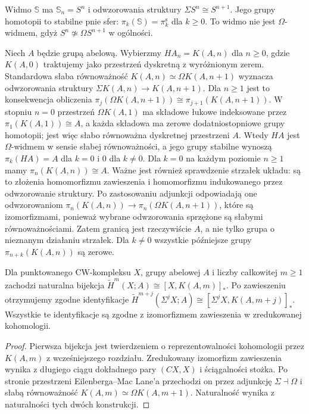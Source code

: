 \begin{przyklad}
Widmo $\mathbb S$ ma $\mathbb S_n=S^n$ i odwzorowania
struktury $\Sigma S^n\cong S^{n+1}$.
Jego grupy homotopii to stabilne pnie sfer:
$\pi_k(\mathbb S)=\pi_k^{\mathrm s}$ dla $k\ge0$.
To widmo nie jest $\Omega$-widmem, gdyż
$S^n\not\simeq\Omega S^{n+1}$ w ogólności.
\end{przyklad}

\begin{przyklad}
Niech $A$ będzie grupą abelową. Wybierzmy
$HA_n=K(A,n)$ dla $n\ge0$, gdzie $K(A,0)$
traktujemy jako przestrzeń dyskretną z wyróżnionym zerem.
Standardowa słaba równoważność
$K(A,n)\simeq\Omega K(A,n+1)$ wyznacza odwzorowania
struktury $\Sigma K(A,n)\to K(A,n+1)$.
Dla $n\ge1$ jest to konsekwencja obliczenia
$\pi_j(\Omega K(A,n+1))\cong\pi_{j+1}(K(A,n+1))$.
W stopniu $n=0$ przestrzeń $\Omega K(A,1)$
ma składowe łukowe indeksowane przez
$\pi_1(K(A,1))\cong A$, a każda składowa
ma zerowe dodatniostopniowe grupy homotopii;
jest więc słabo równoważna dyskretnej przestrzeni $A$.
Wtedy $HA$ jest $\Omega$-widmem w sensie słabej
równoważności, a jego grupy stabilne wynoszą
$\pi_k(HA)=A$ dla $k=0$ i $0$ dla $k\ne0$.
Dla $k=0$ na każdym poziomie $n\ge1$ mamy
$\pi_n(K(A,n))\cong A$. Ważne jest również
sprawdzenie strzałek układu: są to złożenia
homomorfizmu zawieszenia i homomorfizmu
indukowanego przez odwzorowanie struktury.
Po zastosowaniu adjunkcji odpowiadają one odwzorowaniom
$\pi_n(K(A,n))\to\pi_n(\Omega K(A,n+1))$,
które są izomorfizmami, ponieważ wybrane
odwzorowania sprzężone są słabymi równoważnościami.
Zatem granicą jest rzeczywiście $A$,
a nie tylko grupa o nieznanym działaniu strzałek.
Dla $k\ne0$ wszystkie późniejsze grupy
$\pi_{n+k}(K(A,n))$ są zerowe.
\end{przyklad}

\begin{twierdzenie}
\label{thm:HA-rep-v8}
Dla punktowanego CW-kompleksu $X$, grupy abelowej $A$
i liczby całkowitej $m\ge1$ zachodzi naturalna bijekcja
$\widetilde H^m(X;A)\cong[X,K(A,m)]_*$.
Po zawieszeniu otrzymujemy zgodne identyfikacje
$\widetilde H^{m+j}(\Sigma^jX;A)
\cong[\Sigma^jX,K(A,m+j)]_*$.
Wszystkie te identyfikacje są zgodne z izomorfizmem
zawieszenia w zredukowanej kohomologii.
\end{twierdzenie}
\begin{proof}
Pierwsza bijekcja jest twierdzeniem o reprezentowalności
kohomologii przez $K(A,m)$ z wcześniejszego rozdziału.
Zredukowany izomorfizm zawieszenia wynika z długiego
ciągu dokładnego pary $(CX,X)$ i ściągalności stożka.
Po stronie przestrzeni Eilenberga--Mac Lane'a
przechodzi on przez adjunkcję $\Sigma\dashv\Omega$ i
słabą równoważność
$K(A,m)\simeq\Omega K(A,m+1)$.
Naturalność wynika z naturalności tych dwóch konstrukcji.
\end{proof}

